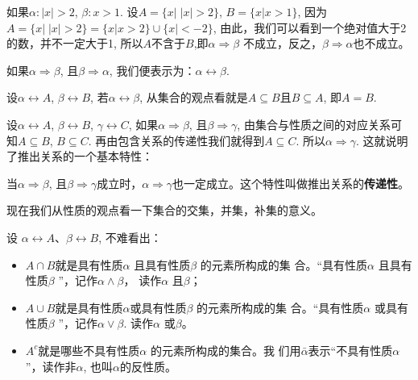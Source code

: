 如果$\alpha :|x|>2$, $\beta :x>1$. 设$A=\{x|\; |x|>2\}$, $B=\{ x| x>1\}$, 因为$A=\{ x|\; |x|>2\}=\{x|x>2\}\cup\{x|<-2\}$, 由此，我们可以看到一个绝对值大于2
的数，并不一定大于1, 所以$A$不含于$B$,即$\alpha \Rightarrow\beta$ 不成立，反之，$\beta \Rightarrow \alpha$也不成立。

如果$\alpha \Rightarrow\beta$, 且$\beta \Rightarrow\alpha$, 我们便表示为：$\alpha\longleftrightarrow \beta$.

设$\alpha \longleftrightarrow A$, $\beta \longleftrightarrow B$, 若$\alpha \longleftrightarrow\beta$, 从集合的观点看就是$A\subseteq B$且$B\subseteq A$, 即$A=B$.

设$\alpha \longleftrightarrow A$, $\beta \longleftrightarrow B$, $\gamma\longleftrightarrow C$, 如果$\alpha \Rightarrow\beta$, 且$\beta \Rightarrow\gamma$, 由集合与性质之间的对应关系可知$A\subseteq B$, $B\subseteq C$. 再由包含关系的传递性我们就得到$A\subseteq C$. 所以$\alpha \Rightarrow\gamma$. 这就说明了推出关系的一个基本特性：

当$\alpha \Rightarrow\beta$, 且$\beta \Rightarrow\gamma$成立时，$\alpha \Rightarrow\gamma$也一定成立。这个特性叫做推出关系的\textbf{传递性}。

现在我们从性质的观点看一下集合的交集，并集，补集的意义。

设 $\alpha \longleftrightarrow A$、$\beta\longleftrightarrow B$, 不难看出：
\begin{itemize}
	\item $A\cap B$就是具有性质$\alpha$ 且具有性质$\beta$ 的元素所构成的集
	合。“具有性质$\alpha$ 且具有性质$\beta$ ”，记作$\alpha \wedge\beta$， 读作$\alpha$ 且$\beta$；
	\item  $A\cup B$就是具有性质$\alpha$或具有性质$\beta$ 的元素所构成的集
	合。“具有性质$\alpha$ 或具有性质$\beta$ ”，记作$\alpha \vee\beta$. 读作$\alpha$ 或$\beta$。 
	\item $A^c$就是哪些不具有性质$\alpha$ 的元素所构成的集合。我
	们用$\bar{\alpha}$表示“不具有性质$\alpha$”，读作非$\alpha$, 也叫$\alpha$的反性质。
\end{itemize}

\begin{figure}[htp]
	\centering
	\caption{}
\end{figure}

